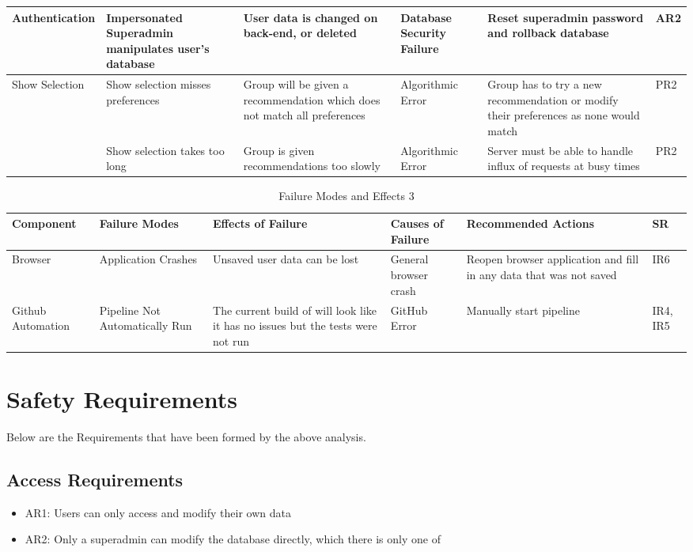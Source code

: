 \documentclass[12pt]{article}
\begin{document}
\begin{landscape}
\begin{table}[hp]
\begin{tabularx}{\linewidth}{| l | X X l X l |}
		\hline
		Authentication & Impersonated Superadmin manipulates user's database & User data is changed on back-end, or deleted & Database Security Failure & Reset superadmin password and rollback database & AR2 \\
		\hline
		Show Selection & Show selection misses preferences & Group will be given a recommendation which does not match all preferences & Algorithmic Error & Group has to try a new recommendation or modify their preferences as none would match & PR2 \\
		\hdashline
		~ & Show selection takes too long & Group is given recommendations too slowly & Algorithmic Error & Server must be able to handle influx of requests at busy times & PR2 \\
		\hline
		\end{tabularx}
\end{table}
\newpage
\begin{table}[hp]
	\caption{Failure Modes and Effects 3} \label{TblFMEA3}
	\begin{tabularx}{\linewidth}{| l | X X l X l |}
		\hline
		Component & Failure Modes & Effects of Failure & Causes of Failure & Recommended Actions & SR \\
		\hline
		Browser & Application Crashes & Unsaved user data can be lost & General browser crash & Reopen browser application and fill in any data that was not saved & IR6 \\
		\hline
		Github Automation & Pipeline Not Automatically Run & The current build of will look like it has no issues but the tests were not run & GitHub Error & Manually start pipeline & IR4, IR5 \\
		\hline
		\end{tabularx}
\end{table}
\end{landscape}

\section{Safety Requirements}
Below are the Requirements that have been formed by the above analysis.

\subsection{Access Requirements}
\begin{itemize}
	\item AR1: Users can only access and modify their own data
	\item AR2: Only a superadmin can modify the database directly, which there is only one of
\end{itemize}
\end{document}
